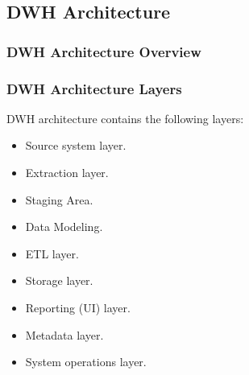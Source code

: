 \subsection{DWH Architecture}
\begin{frame}
\frametitle{DWH Architecture Overview}

\end{frame}
\begin{frame}
\frametitle{DWH Architecture Layers}

\begin{wideitemize}
	\item DWH architecture contains the following layers:
	\begin{itemize}[<+->]
		\item Source system layer.
		\item Extraction layer.
		\item Staging Area.
		\item Data Modeling.
		\item ETL layer.
		\item Storage layer.
		\item Reporting (UI) layer.
		\item Metadata layer.
		\item System operations layer.
	\end{itemize}
\end{wideitemize}

\end{frame}
\VideoClassification[column=2, colour=blue]




